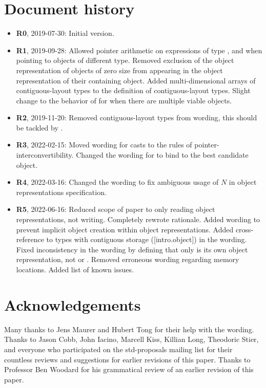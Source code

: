 
\section*{Document history}

\begin{itemize}
  \item \textbf{R0}, 2019-07-30: Initial version.
  \item \textbf{R1}, 2019-09-28: Allowed pointer arithmetic on expressions of type ,  and  when pointing to objects of different type. Removed exclusion of the object representation of objects of zero size from appearing in the object representation of their containing object. Added multi-dimensional arrays of contiguous-layout types to the definition of contiguous-layout types. Slight change to the behavior of  for when there are multiple viable objects.
  \item \textbf{R2}, 2019-11-20: Removed contiguous-layout types from wording, this should be tackled by \cite{P1945R0}.
  \item \textbf{R3}, 2022-02-15: Moved wording for casts to the rules of pointer-interconvertibility. Changed the wording for  to bind to the best candidate object.
  \item \textbf{R4}, 2022-03-16: Changed the wording to fix ambiguous usage of $N$ in object representations specification.
  \item \textbf{R5}, 2022-06-16: Reduced scope of paper to only reading object representations, not writing. Completely rewrote rationale. Added wording to prevent implicit object creation within object representations. Added cross-reference to types with contiguous storage ([intro.object]) in the wording. Fixed inconsistency in the wording by defining that only  is its own object representation, not  or . Removed erroneous wording regarding memory locations. Added list of known issues.
\end{itemize}


\section*{Acknowledgements}

Many thanks to Jens Maurer and Hubert Tong for their help with the wording. Thanks to Jason Cobb, John Iacino, Marcell Kiss, Killian Long, Theodoric Stier, and everyone who participated on the std-proposals mailing list for their countless reviews and suggestions for earlier revisions of this paper. Thanks to Professor Ben Woodard for his grammatical review of an earlier revision of this paper.



\renewcommand{\bibname}{References}



